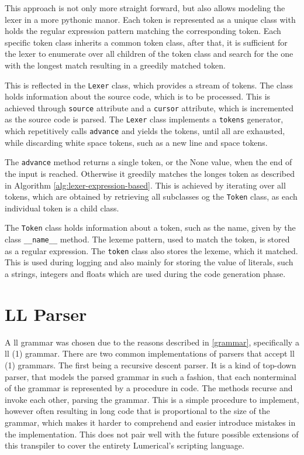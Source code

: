 This approach is not only more straight forward, but also allows modeling the lexer in a more pythonic manor. Each token is represented as a unique class with holds the regular expression pattern matching the corresponding token. Each specific token class inherits a common token class, after that, it is sufficient for the lexer to enumerate over all children of the token class and search for the one with the longest match resulting in a greedily matched token.


This is reflected in the \texttt{Lexer} class, which provides a stream of tokens. The class holds information about the source code, which is to be processed. This is achieved through \texttt{source} attribute and a \texttt{cursor} attribute, which is incremented as the source code is parsed. The \texttt{Lexer} class implements a \texttt{tokens} generator, which repetitively calls \texttt{advance} and yields the tokens, until all are exhausted, while discarding white space tokens, such as a new line and space tokens. 

The \texttt{advance} method returns a single token, or the None value, when the end of the input is reached. Otherwise it greedily matches the longes token as described in Algorithm \ref{alg:lexer-expression-based}. This is achieved by iterating over all tokens, which are obtained by retrieving all subclasses og the \texttt{Token} class, as each individual token is a child class.

The \texttt{Token} class holds information about a token, such as the name, given by the class \texttt{\_\_name\_\_} method. The lexeme pattern, used to match the token, is stored as a regular expression. The \texttt{token} class also stores the lexeme, which it matched. This is used during logging and also mainly for storing the value of literals, such a strings, integers and floats which are used during the code generation phase.


\section{LL Parser}
A \gls{ll} grammar was chosen due to the reasons described in \ref{grammar}, specifically a \gls{ll} (1) grammar. There are two common implementations of parsers that accept \gls{ll} (1) grammars. The first being a recursive descent parser. It is a kind of top-down parser, that models the parsed grammar in such a fashion, that each nonterminal of the grammar is represented by a procedure in code. The methods recurse and invoke each other, parsing the grammar. This is a simple procedure to implement, however often resulting in long code that is proportional to the size of the grammar, which makes it harder to comprehend and easier introduce mistakes in the implementation. This does not pair well with the future possible extensions of this transpiler to cover the entirety Lumerical's scripting language.

